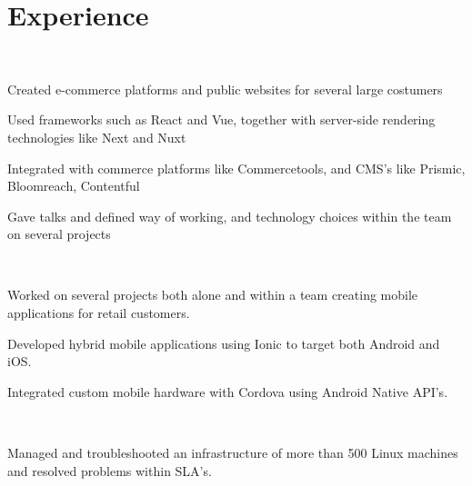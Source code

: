 \documentclass[]{hieudo-build}
\begin{document}
\hfill
\begin{minipage}[t]{0.7\textwidth} 

\section{Experience}

\\
\vspace{0.9em} %
\begin{tightemize}
\item Created e-commerce platforms and public websites for several large costumers
\item Used frameworks such as React and Vue, together with server-side rendering technologies like Next and Nuxt
\item Integrated with commerce platforms like Commercetools, and CMS's like Prismic, Bloomreach, Contentful
\item Gave talks and defined way of working, and technology choices within the team on several projects
\end{tightemize}
\sectionsep

\\
\begin{tightemize}
\item Worked on several projects both alone and within a team creating mobile applications for retail customers.
\item Developed hybrid mobile applications using Ionic to target both Android and iOS.
\item Integrated custom mobile hardware with Cordova using Android Native API's.
\end{tightemize}
\sectionsep

 \\
\begin{tightemize}
\item Managed and troubleshooted an infrastructure of more than 500 Linux machines and resolved problems within SLA's.
\end{tightemize}
\sectionsep


\end{minipage}
\end{document}
